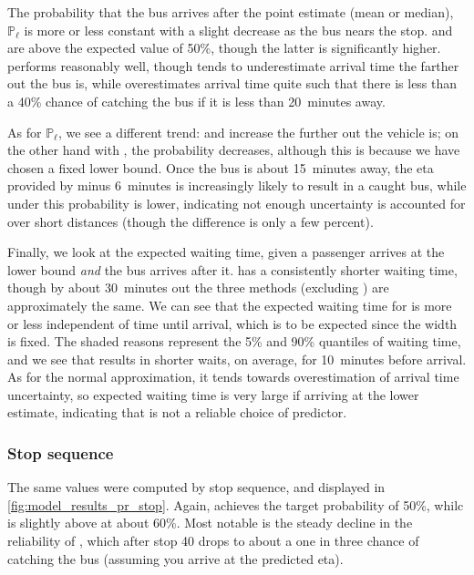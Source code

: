 The probability that the bus arrives after the point estimate (mean or median), $\mathbb{P}_\ell$ is more or less constant with a slight decrease as the bus nears the stop. \Fpf{} and \Fnorm{} are above the expected value of 50\%, though the latter is significantly higher. \Fnorm{} performs reasonably well, though tends to underestimate arrival time the farther out the bus is, while \Fsched{} overestimates arrival time quite such that there is less than a 40\% chance of catching the bus if it is less than 20~minutes away.


As for $\mathbb{P}_\ell$, we see a different trend: \Fpf{} and \Fhist{} increase the further out the vehicle is; on the other hand with \Fsched{}, the probability decreases, although this is because we have chosen a fixed lower bound. Once the bus is about 15~minutes away, the \gls{eta} provided by \Fsched{} minus 6~minutes is increasingly likely to result in a caught bus, while under \Fpf{} this probability is lower, indicating not enough uncertainty is accounted for over short distances (though the difference is only a few percent).


Finally, we look at the expected waiting time, given a passenger arrives at the lower bound \emph{and} the bus arrives after it. \Fpf{} has a consistently shorter waiting time, though by about 30~minutes out the three methods (excluding \Fnorm{}) are approximately the same. We can see that the expected waiting time for \Fsched{} is more or less independent of time until arrival, which is to be expected since the width is fixed. The shaded reasons represent the 5\% and 90\% quantiles of waiting time, and we see that \Fpf{} results in shorter waits, on average, for 10~minutes before arrival. As for the normal approximation, it tends towards overestimation of arrival time uncertainty, so expected waiting time is very large if arriving at the lower estimate, indicating that \Fnorm{} is not a reliable choice of predictor.



\subsubsection{Stop sequence}

The same values were computed by stop sequence, and displayed in \cref{fig:model_results_pr_stop}. Again, \Fhist{} achieves the target probability of 50\%, whilc \Fpf{} is slightly above at about 60\%. Most notable is the steady decline in the reliability of \Fsched{}, which after stop 40 drops to about a one in three chance of catching the bus (assuming you arrive at the predicted \gls{eta}).



